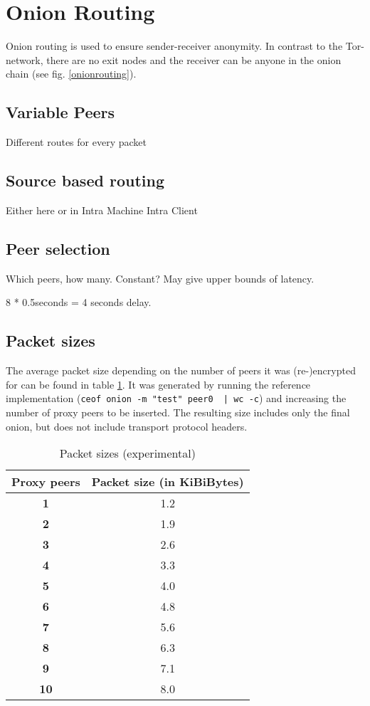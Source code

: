 \section{Onion Routing}
Onion routing is used to ensure sender-receiver anonymity. In contrast
to the Tor-network, there are no exit nodes and the receiver can be anyone
in the onion chain (see fig. \ref{onionrouting}).

\subsection{Variable Peers}
Different routes for every packet

\subsection{Source based routing}
Either here or in Intra Machine Intra Client
\subsection{Peer selection}
Which peers, how many. Constant? May give upper bounds of latency.

8 * 0.5seconds = 4 seconds delay.


\subsection{Packet sizes}
The average packet size depending on the number of peers it was
(re-)encrypted for can be found in table \ref{pkgsizes}.
It was generated by running the reference implementation
(\verb=ceof onion -m "test" peer0  | wc -c=)
and increasing the number of proxy peers to be inserted.
The resulting size includes only the final onion,
but does not include transport protocol headers.
\begin{longtable}{|c|c|}
\caption{Packet sizes (experimental)}
\label{pkgsizes}\\
\hline
\textbf{Proxy peers} & \textbf{Packet size (in KiBiBytes)}\\
\hline
\textbf{1} & 1.2\\
\hline
\textbf{2} & 1.9\\
\hline
\textbf{3} & 2.6\\
\hline
\textbf{4} & 3.3\\
\hline
\textbf{5} & 4.0\\
\hline
\textbf{6} & 4.8\\
\hline
\textbf{7} & 5.6\\
\hline
\textbf{8} & 6.3\\
\hline
\textbf{9} & 7.1\\
\hline
\textbf{10} & 8.0\\
\hline
\end{longtable}



